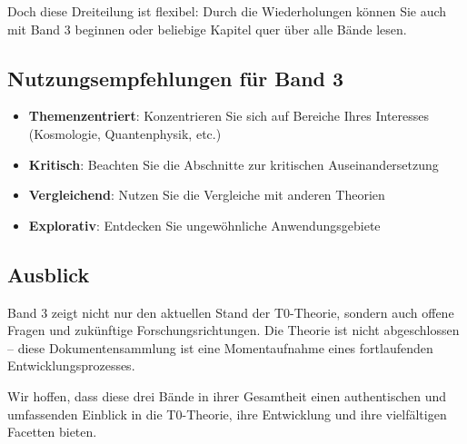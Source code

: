 Doch diese Dreiteilung ist flexibel: Durch die Wiederholungen können Sie auch mit Band 3 beginnen oder beliebige Kapitel quer über alle Bände lesen.

\subsection*{Nutzungsempfehlungen für Band 3}

\begin{itemize}
\item \textbf{Themenzentriert}: Konzentrieren Sie sich auf Bereiche Ihres Interesses (Kosmologie, Quantenphysik, etc.)
\item \textbf{Kritisch}: Beachten Sie die Abschnitte zur kritischen Auseinandersetzung
\item \textbf{Vergleichend}: Nutzen Sie die Vergleiche mit anderen Theorien
\item \textbf{Explorativ}: Entdecken Sie ungewöhnliche Anwendungsgebiete
\end{itemize}

\subsection*{Ausblick}

Band 3 zeigt nicht nur den aktuellen Stand der T0-Theorie, sondern auch offene Fragen und zukünftige Forschungsrichtungen. Die Theorie ist nicht abgeschlossen -- diese Dokumentensammlung ist eine Momentaufnahme eines fortlaufenden Entwicklungsprozesses.

\vspace{1em}
\noindent
Wir hoffen, dass diese drei Bände in ihrer Gesamtheit einen authentischen und umfassenden Einblick in die T0-Theorie, ihre Entwicklung und ihre vielfältigen Facetten bieten.


